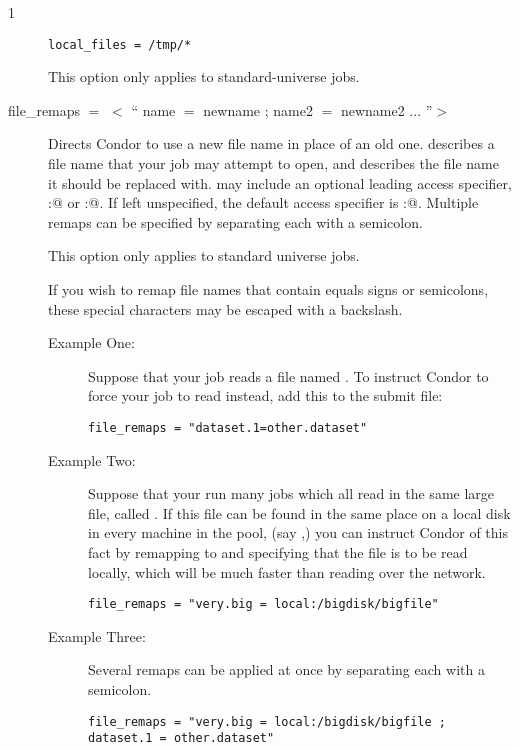 \begin{ManPage}{\label{man-condor-submit}}{1}
\begin{description}
\begin{verbatim}
local_files = /tmp/*
\end{verbatim}

This option only applies to standard-universe jobs.


\item[file\_remaps $=$ $<$ `` name $=$ newname ; name2 $=$ newname2 ... ''$>$ ]

Directs Condor to use a new file name in place of an old one.  
describes a file name that your job may attempt to open, and 
describes the file name it should be replaced with.
 may include an optional leading
access specifier, \verb@local:@ or \verb@remote:@.  If left unspecified,
the default access specifier is \verb@remote:@.  Multiple remaps can be 
specified by separating each with a semicolon.

This option only applies to standard universe jobs.

If you wish to remap file names that contain equals signs or semicolons,
these special characters may be escaped with a backslash.

\begin{description}
\item[Example One:]
Suppose that your job reads a file named .
To instruct Condor
to force your job to read  instead, 
add this to the submit file:
\begin{verbatim}
file_remaps = "dataset.1=other.dataset"
\end{verbatim}
\item[Example Two:]
Suppose that your run many jobs which all read in the same large file,
called .
If this file can be found in the same place on
a local disk in every machine in the pool,
(say ,) you can
instruct Condor of this fact by remapping  to
 and specifying that the file is to be read locally,
which will be much faster than reading over the network.
\begin{verbatim}
file_remaps = "very.big = local:/bigdisk/bigfile"
\end{verbatim}
\item[Example Three:]
Several remaps can be applied at once by separating each with a semicolon.
\begin{verbatim}
file_remaps = "very.big = local:/bigdisk/bigfile ; dataset.1 = other.dataset"
\end{verbatim}
\end{description}


\end{description}
\end{ManPage}
